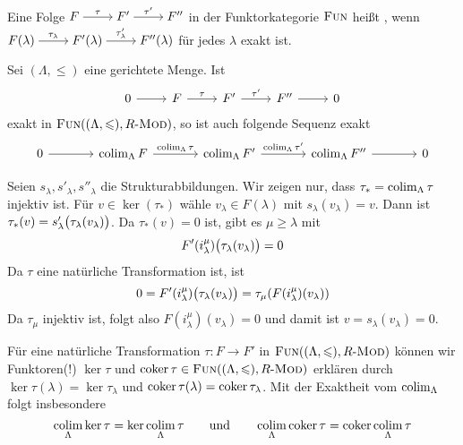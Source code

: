 \begin{definition}[{name=[Exaktheit in der Funktorkategorie]}]
	Eine Folge 
	\( \begin{tikzcd}[cramped]
		F \rar["\tau"] & F' \rar["\tau'"] & F''
	\end{tikzcd} \) 
	in der Funktorkategorie $\textsc{Fun}$ heißt , wenn 
	\( \begin{tikzcd}[cramped]
		F(\lambda)\rar["\tau_\lambda"] & F'(\lambda) \rar["\tau_\lambda'"] & F''(\lambda)
	\end{tikzcd} \) 
	für jedes $\lambda$ exakt ist.
\end{definition}


\begin{satz}[name={Exaktheit gerichteter Kolimiten}]
	Sei $(\Lambda,\le)$ eine gerichtete Menge. Ist 
	\[
		\begin{tikzcd}
			0 \rar & F \rar["\tau"] & F' \rar["\tau'"] & F'' \rar & 0
		\end{tikzcd}
	\]
	exakt in $\FUN \enbrace*{(\Lambda,\le), R\text{-}\MOD}$, so ist auch folgende Sequenz exakt
	\[
		\begin{tikzcd}[sep=large]
			0 \rar & \colim_\Lambda F \rar["\colim_\Lambda \tau"] & \colim_\Lambda F' \rar["\colim_\Lambda \tau'"] & \colim_\Lambda F'' \rar & 0
		\end{tikzcd}
	\]
\end{satz}
\begin{beweis}
	Seien $s_\lambda, s'_\lambda, s''_\lambda$ die Strukturabbildungen. 
	Wir zeigen nur, dass $\tau_* =\operatorname*{colim}_\Lambda \tau$ injektiv ist. 
	Für $v \in \ker (\tau_*)$ wähle $v_\lambda \in F(\lambda)$ mit $s_\lambda(v_\lambda)=v$.
	Dann ist $\tau_*(v)=s_\lambda'\enbrace[\big]{\tau_\lambda \enbrace*{v_\lambda}}$.
	Da $\tau_*(v)=0$ ist, gibt es $\mu \ge \lambda$ mit 
	\[
		F'(i_\lambda^\mu) \enbrace[\big]{\tau_\lambda \enbrace*{v_\lambda}}=0
	\]
	Da $\tau$ eine natürliche Transformation ist, ist 
	\begin{align}
		0=F'(i_\lambda^\mu) \enbrace[\big]{ \tau_\lambda(v_\lambda)} = \tau_\mu \enbrace*{F(i_\lambda^\mu)(v_\lambda)}
	\end{align}
	Da $\tau_\mu$ injektiv ist, folgt also $F(i_\lambda^\mu)(v_\lambda)=0$ und damit ist $v=s_\lambda(v_\lambda)=0$.
\end{beweis}

\begin{bemerkung}[{name=[gerichteter Kolimes von Kern und Kokern]},label=bem:colim_ker_coker]
	Für eine natürliche Transformation $\tau \colon F \to F'$ in $\FUN \enbrace*{(\Lambda,\le),R \text{-}\MOD}$ können wir Funktoren(!) $\ker \tau$ und $\coker \tau \in \FUN \enbrace*{(\Lambda,\le), R \text{-}\MOD}$ erklären durch $\ker \tau (\lambda) = \ker \tau_\lambda$ und $\operatorname{coker} \tau(\lambda) = \operatorname{coker} \tau_\lambda$.
	Mit der Exaktheit vom $\operatorname*{colim}_\Lambda$ folgt insbesondere
	\[
		\operatorname*{colim}_\Lambda \ker \tau = \ker \operatorname*{colim}_\Lambda \tau \qquad \text{und} \qquad \operatorname*{colim}_\Lambda \operatorname{coker} \tau = \operatorname{coker} \operatorname*{colim}_\Lambda \tau
	\]
\end{bemerkung}

